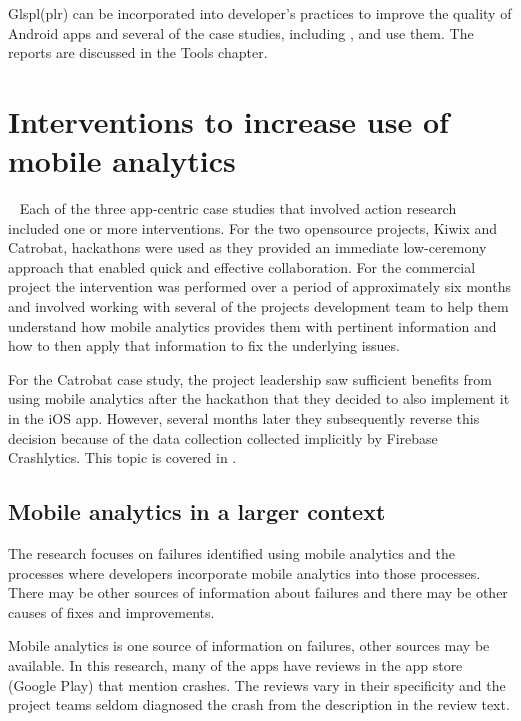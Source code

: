 Glspl(plr) can be incorporated into developer's practices to improve the quality of Android apps and several of the case studies, including ,  and  use them. The reports are discussed in the Tools chapter.


\section{Interventions to increase use of mobile analytics}~\label{aiu-interventions-theme}
Each of the three app-centric case studies that involved action research included one or more interventions. For the two opensource projects, Kiwix and Catrobat, hackathons were used as they provided an immediate low-ceremony approach that enabled quick and effective collaboration. For the commercial project the intervention was performed over a period of approximately six months and involved working with several of the projects development team to help them understand how mobile analytics provides them with pertinent information and how to then apply that information to fix the underlying issues. 

For the Catrobat case study, the project leadership saw sufficient benefits from using mobile analytics after the hackathon that they decided to also implement it in the iOS app. However, several months later they subsequently reverse this decision because of the data collection collected implicitly by Firebase Crashlytics. This topic is covered in .


\subsection{Mobile analytics in a larger context}
The research focuses on failures identified using mobile analytics and the processes where developers incorporate mobile analytics into those processes. There may be other sources of information about failures and there may be other causes of fixes and improvements.

Mobile analytics is one source of information on failures, other sources may be available. In this research, many of the apps have reviews in the app store (Google Play) that mention crashes. The reviews vary in their specificity and the project teams seldom diagnosed the crash from the description in the review text.   

